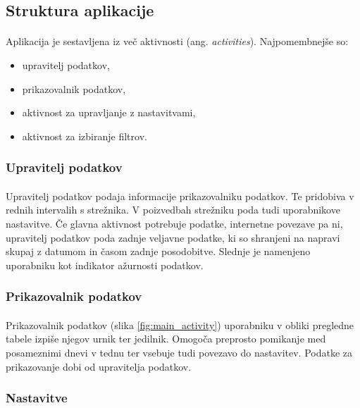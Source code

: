 \subsection{Struktura aplikacije}
\paragraph{}Aplikacija je sestavljena iz več aktivnosti (ang. \textit{activities}). Najpomembnejše so:
\begin{itemize}
  \setlength\itemsep{0em}
  \item upravitelj podatkov,
  \item prikazovalnik podatkov,
  \item aktivnost za upravljanje z nastavitvami,
  \item aktivnost za izbiranje filtrov.
\end{itemize}

\subsubsection{Upravitelj podatkov}
\paragraph{}Upravitelj podatkov podaja informacije prikazovalniku podatkov. Te pridobiva v rednih intervalih s strežnika. V poizvedbah strežniku poda tudi uporabnikove nastavitve. Če glavna aktivnost potrebuje podatke, internetne povezave pa ni, upravitelj podatkov poda zadnje veljavne podatke, ki so shranjeni na napravi skupaj z datumom in časom zadnje posodobitve. Slednje je namenjeno uporabniku kot indikator ažurnosti podatkov.

\subsubsection{Prikazovalnik podatkov}
\paragraph{}Prikazovalnik podatkov (slika \ref{fig:main_activity}) uporabniku v obliki pregledne tabele izpiše njegov urnik ter jedilnik. Omogoča preprosto pomikanje med posameznimi dnevi v tednu ter vsebuje tudi povezavo do nastavitev. Podatke za prikazovanje dobi od upravitelja podatkov.

\subsubsection{Nastavitve}
